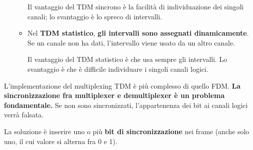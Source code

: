 \begin{itemize}
\begin{itemize}
                        \vspace{3mm}
                        
                        Il vantaggio del TDM sincrono è la facilità di individuazione dei singoli canali; lo svantaggio è lo spreco di intervalli.
                    
                    \item
                        Nel \textbf{TDM statistico}, \textbf{gli intervalli sono assegnati dinamicamente}. Se un canale non ha dati, l'intervallo viene usato da un altro canale.
                        
                        \vspace{3mm}
                        
                        Il vantaggio del TDM statistico è che usa sempre gli intervalli. Lo svantaggio è che è difficile individuare i singoli canali logici.
                \end{itemize}
        \end{itemize}

        L'implementazione del multiplexing TDM è più complesso di quello FDM. \textbf{La sincronizzazione fra multiplexer e demultiplexer è un problema fondamentale.} Se non sono sincronizzati, l'appartenenza dei bit ai canali logici verrà falsata. 
        
        La soluzione è inserire uno o più \textbf{bit di sincronizzazione} nei frame (anche solo uno, il cui valore si alterna fra 0 e 1).